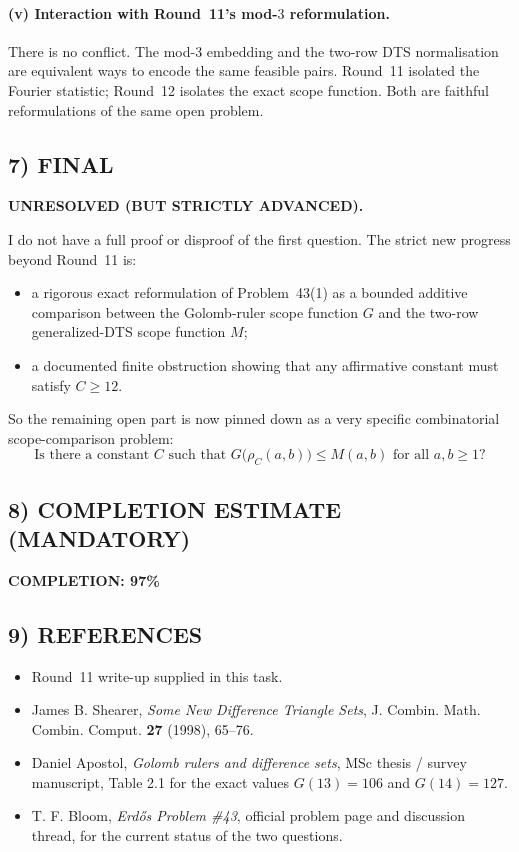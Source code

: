 \paragraph{(v) Interaction with Round~11's mod-$3$ reformulation.}
There is no conflict. The mod-$3$ embedding and the two-row DTS normalisation are equivalent ways to encode the same feasible pairs. Round~11 isolated the Fourier statistic; Round~12 isolates the exact scope function. Both are faithful reformulations of the same open problem.

\subsection{7) FINAL}

\textbf{UNRESOLVED (BUT STRICTLY ADVANCED).}

I do not have a full proof or disproof of the first question. The strict new progress beyond Round~11 is:
\begin{itemize}
\item a rigorous exact reformulation of Problem~43(1) as a bounded additive comparison between the Golomb-ruler scope function $G$ and the two-row generalized-DTS scope function $M$;
\item a documented finite obstruction showing that any affirmative constant must satisfy $C\ge 12$.
\end{itemize}

So the remaining open part is now pinned down as a very specific combinatorial scope-comparison problem:
\[
\text{Is there a constant }C\text{ such that }G\bigl(\rho_C(a,b)\bigr)\le M(a,b)\text{ for all }a,b\ge 1?
\]

\subsection{8) COMPLETION ESTIMATE (MANDATORY)}

\textbf{COMPLETION: 97\%}

\subsection{9) REFERENCES}

\begin{itemize}
\item Round~11 write-up supplied in this task.
\item James B. Shearer, \emph{Some New Difference Triangle Sets}, J. Combin. Math. Combin. Comput. \textbf{27} (1998), 65--76.
\item Daniel Apostol, \emph{Golomb rulers and difference sets}, MSc thesis / survey manuscript, Table 2.1 for the exact values $G(13)=106$ and $G(14)=127$.
\item T. F. Bloom, \emph{Erd\H{o}s Problem \#43}, official problem page and discussion thread, for the current status of the two questions.
\end{itemize}
